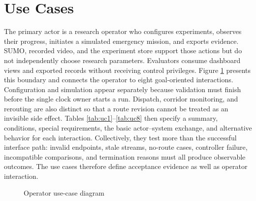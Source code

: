 \section{Use Cases}

The primary actor is a research operator who configures experiments, observes their progress, initiates a simulated emergency mission, and exports evidence. SUMO, recorded video, and the experiment store support those actions but do not independently choose research parameters. Evaluators consume dashboard views and exported records without receiving control privileges. Figure \ref{fig:use-case} presents this boundary and connects the operator to eight goal-oriented interactions. Configuration and simulation appear separately because validation must finish before the single clock owner starts a run. Dispatch, corridor monitoring, and rerouting are also distinct so that a route revision cannot be treated as an invisible side effect. Tables \ref{tab:uc1}--\ref{tab:uc8} then specify a summary, conditions, special requirements, the basic actor--system exchange, and alternative behavior for each interaction. Collectively, they test more than the successful interface path: invalid endpoints, stale streams, no-route cases, controller failure, incompatible comparisons, and termination reasons must all produce observable outcomes. The use cases therefore define acceptance evidence as well as operator interaction.

\begin{figure}[htbp]
\centering
{}
\caption{Operator use-case diagram}
\label{fig:use-case}
\end{figure}

